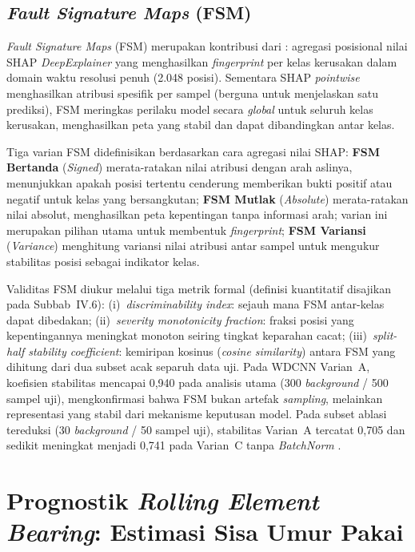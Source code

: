 \subsection{\emph{Fault Signature Maps} (FSM)}
\label{subsec:bab2_fsm}

\emph{Fault Signature Maps} (FSM) merupakan kontribusi dari
: agregasi posisional nilai SHAP
\emph{DeepExplainer} yang menghasilkan \emph{fingerprint} per kelas kerusakan
dalam domain waktu resolusi penuh (2.048 posisi). Sementara SHAP \emph{pointwise}
menghasilkan atribusi spesifik per sampel (berguna untuk menjelaskan satu
prediksi), FSM meringkas perilaku model secara \emph{global} untuk seluruh
kelas kerusakan, menghasilkan peta yang stabil dan dapat dibandingkan
antar kelas.

Tiga varian FSM didefinisikan berdasarkan cara agregasi nilai SHAP:
\textbf{FSM Bertanda} (\emph{Signed}) merata-ratakan nilai atribusi dengan
arah aslinya, menunjukkan apakah posisi tertentu cenderung memberikan bukti
positif atau negatif untuk kelas yang bersangkutan; \textbf{FSM Mutlak}
(\emph{Absolute}) merata-ratakan nilai absolut, menghasilkan peta kepentingan
tanpa informasi arah; varian ini merupakan pilihan utama untuk membentuk
\emph{fingerprint}; \textbf{FSM Variansi} (\emph{Variance}) menghitung variansi nilai atribusi
antar sampel untuk mengukur stabilitas posisi sebagai indikator kelas.

Validitas FSM diukur melalui tiga metrik formal (definisi kuantitatif
disajikan pada Subbab~IV.6): (i)~\emph{discriminability index}: sejauh mana
FSM antar-kelas dapat dibedakan; (ii)~\emph{severity monotonicity fraction}:
fraksi posisi yang kepentingannya meningkat monoton seiring tingkat
keparahan cacat; (iii)~\emph{split-half stability coefficient}: {\color{blue}kemiripan
kosinus (\emph{cosine similarity})} antara FSM yang dihitung dari dua subset acak separuh data uji.
{\color{blue}Pada WDCNN Varian~A, koefisien stabilitas mencapai 0,940
pada analisis utama (300 \emph{background} / 500 sampel uji),
mengkonfirmasi bahwa FSM bukan artefak \emph{sampling}, melainkan representasi
yang stabil dari mekanisme keputusan model. Pada subset ablasi tereduksi
(30 \emph{background} / 50 sampel uji), stabilitas Varian~A tercatat 0,705
dan sedikit meningkat menjadi 0,741 pada Varian~C tanpa \emph{BatchNorm}
.}

\section{Prognostik \emph{Rolling Element Bearing}: Estimasi Sisa Umur Pakai}
\label{sec:bab2_prognostik}

